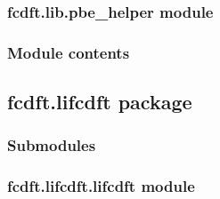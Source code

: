 \documentclass[letterpaper,10pt,english]{sphinxmanual}
\begin{document}
\subsubsection{fcdft.lib.pbe\_helper module}
\label{\detokenize{fcdft.lib:fcdft-lib-pbe-helper-module}}

\subsubsection{Module contents}
\label{\detokenize{fcdft.lib:module-fcdft.lib}}\label{\detokenize{fcdft.lib:module-contents}}
\sphinxstepscope


\subsection{fcdft.lifcdft package}
\label{\detokenize{fcdft.lifcdft:fcdft-lifcdft-package}}\label{\detokenize{fcdft.lifcdft::doc}}

\subsubsection{Submodules}
\label{\detokenize{fcdft.lifcdft:submodules}}

\subsubsection{fcdft.lifcdft.lifcdft module}
\label{\detokenize{fcdft.lifcdft:module-fcdft.lifcdft.lifcdft}}\label{\detokenize{fcdft.lifcdft:fcdft-lifcdft-lifcdft-module}}
\end{document}
